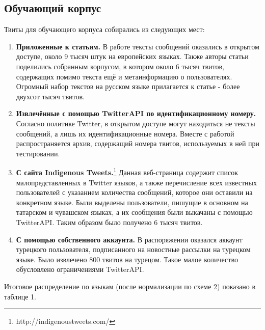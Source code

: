 \documentclass[a4paper, 14pt]{article}
\begin{document}
		\subsection{Обучающий корпус}   
			Твиты для обучающего корпуса собирались из следующих мест:
			\begin{enumerate}
				\item \textbf{Приложенные к статьям.} В работе \cite{liga} тексты сообщений оказались в открытом доступе, около 9 тысяч штук на европейских языках. Также авторы статьи \cite{ppm} поделились собранным корпусом, в котором около 6 тысяч твитов, содержащих помимо текста ещё и метаинформацию о пользователях. Огромный набор текстов на русском языке прилагается к статье \cite{julia} - более двухсот тысяч твитов.
				\item \textbf{Извлечённые с помощью TwitterAPI по идентификационному номеру.} Согласно политике Twitter, в открытом доступе могут находиться не тексты сообщений, а лишь их идентификационные номера. Вместе с работой \cite{lrev} распространяется архив, содержащий номера твитов, используемых в ней при тестировании. 
				\item \textbf{С сайта Indigenous Tweets.}\footnote{http://indigenoustweets.com/} Данная веб-страница содержит список малопредставленных в Twitter языков, а также перечисление всех известных пользователей с указанием количества сообщений, которое они оставили на конкретном языке. Были выделены пользователи, пишущие в основном на татарском и чувашском языках, а их сообщения были выкачаны с помощью TwitterAPI. Таким образом было получено 6 тысяч твитов.
				\item \textbf{С помощью собственного аккаунта.} В распоряжении оказался аккаунт турецкого пользователя, подписанного на новостные рассылки на турецком языке. Было извлечено 800 твитов на турецом. Такое малое количество обусловлено ограничениями TwitterAPI.
			\end{enumerate}		
			Итоговое распределение по языкам (после нормализации по схеме 2) показано в таблице 1.	  
			 
\end{document}
